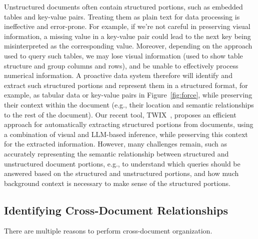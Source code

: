 Unstructured documents often contain structured
portions, such as embedded
tables and key-value pairs.
Treating them as plain text for data processing is ineffective
and error-prone.
For example, if we're not careful in preserving visual information, 
a missing value in a key-value pair
could lead to the next key being misinterpreted
as the corresponding value.
Moreover, depending on the approach used
to query such tables,
we may lose visual information (used to show table structure and group columns and rows),
and be unable to effectively process
numerical information. 
A proactive data system
therefore will identify and extract such structured portions
and represent them in a structured format, for example, as tabular data or key-value pairs in Figure~\ref{fig:force},
while preserving their context within the document (e.g., their location and semantic relationships to the rest of the document).
Our recent tool, TWIX~\cite{lin2025twix}, proposes an efficient approach 
for automatically extracting structured portions from documents, using a combination of visual
and LLM-based inference, while preserving this context for the extracted
information. 
However, many challenges remain, such as accurately representing the semantic 
relationship between structured and unstructured document portions, 
e.g., to understand which queries should be answered 
based on the structured and unstructured portions,
and how much background context is necessary to make sense of the structured portions.






\subsection{Identifying Cross-Document Relationships}\label{subsec:cross-doc}
There are multiple reasons
to perform cross-document organization.

